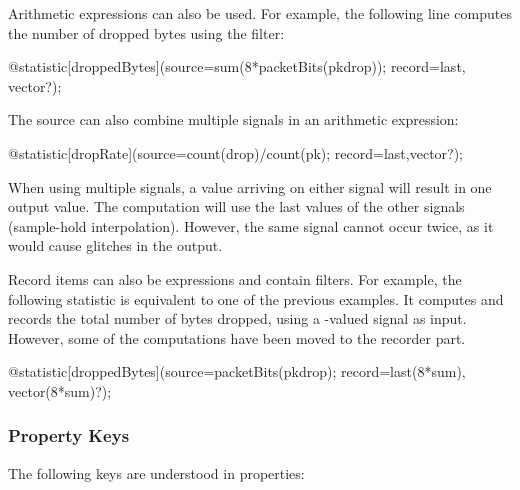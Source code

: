 Arithmetic expressions can also be used. For example, the following line
computes the number of dropped bytes using the  filter:

\begin{ned}
@statistic[droppedBytes](source=sum(8*packetBits(pkdrop)); record=last,
vector?);
\end{ned}

The source can also combine multiple signals in an arithmetic expression:

\begin{ned}
@statistic[dropRate](source=count(drop)/count(pk); record=last,vector?);
\end{ned}

When using multiple signals, a value arriving on either signal will result
in one output value. The computation will use the last values of the other
signals (sample-hold interpolation). However, the same signal cannot occur
twice, as it would cause glitches in the output.

Record items can also be expressions and contain filters. For example,
the following statistic is equivalent to one of the previous examples.
It computes and records the total number of bytes dropped, using a
-valued signal as input. However, some of the computations
have been moved to the recorder part.

\begin{ned}
@statistic[droppedBytes](source=packetBits(pkdrop); record=last(8*sum),
vector(8*sum)?);
\end{ned}


\subsubsection{Property Keys}
\label{sec:simple-modules:declared-statistics:property-keys}

The following keys are understood in  properties:

